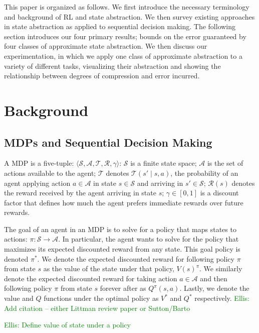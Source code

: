 \documentclass{article}
\newcommand\enote[1]{\textcolor{green}{Ellis: #1}}
\begin{document}
This paper is organized as follows. We first introduce the necessary terminology and background of \ac{RL} and state abstraction. We then survey existing approaches in state abstraction as applied to sequential decision making. The following section introduces our four primary results; bounds on the error guaranteed by four classes of approximate state abstraction. We then discuss our experimentation, in which we apply one class of approximate abstraction to a variety of different tasks, visualizing their abstraction and showing the relationship between degrees of compression and error incurred.


\section{Background}

\subsection{\acp{MDP} and Sequential Decision Making}
A \ac{MDP} is a five-tuple: $\langle \mathcal{S}, \mathcal{A}, \mathcal{T}, \mathcal{R}, \gamma \rangle$: $\mathcal{S}$ is a finite state space; $\mathcal{A}$ is the set of actions available to the agent; $\mathcal{T}$ denotes $\mathcal{T}(s' \mid s,a)$, the probability of an agent applying action $a \in \mathcal{A}$ in state $s \in \mathcal{S}$ and arriving in $s' \in \mathcal{S}$; $\mathcal{R}(s)$ denotes the reward received by the agent arriving in state $s$; $\gamma \in [0, 1]$ is a discount  factor that defines how much the agent prefers immediate rewards over future rewards.

The goal of an agent in an \ac{MDP} is to solve for a policy that maps states to actions: $\pi: \mathcal{S} \rightarrow \mathcal{A}$. In particular, the agent wants to solve for the policy that maximizes its expected discounted reward from any state. This goal policy is denoted $\pi^*$. We denote the expected discounted reward for following policy $\pi$ from state $s$ as the value of the state under that policy, $V(s)^\pi$. We similarly denote the expected discounted reward for taking action $a \in \mathcal{A}$ and then following policy $\pi$ from state $s$ forever after as $Q^\pi(s,a)$. Lastly, we denote the value and $Q$ functions under the optimal policy as $V^*$ and $Q^*$ respectively. \enote{Add citation -- either Littman review paper or Sutton/Barto}

\enote{Define value of state under a policy}
\end{document}
